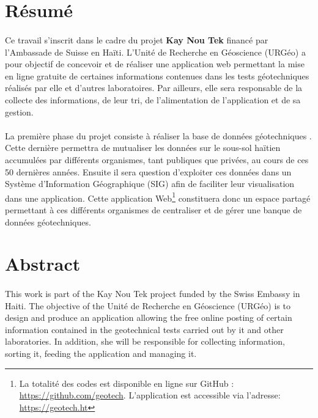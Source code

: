 \section{Résumé}
\paragraph{}
Ce travail s'inscrit dans le cadre du projet \textbf{Kay Nou Tek}
financé par l’Ambassade de Suisse en Haïti. 
L'Unité de Recherche en Géoscience (URGéo) a pour objectif de concevoir et de réaliser
une application web permettant la mise en 
ligne gratuite de certaines informations contenues dans les tests 
géotechniques réalisés par elle et d’autres laboratoires.
Par ailleurs, elle sera responsable de la collecte des informations, de leur tri, de l’alimentation 
de l’application et de sa gestion. 
\paragraph{}
La première phase du projet consiste à réaliser la base de données géotechniques
. Cette dernière permettra de mutualiser les données 
 sur le sous-sol haïtien accumulées par différents organismes, tant publiques que privées, 
 au cours de ces 50 dernières années. Ensuite il sera question d'exploiter ces 
 données dans un Système d'Information Géographique (SIG)  afin de faciliter leur visualisation dans une application.
  Cette application 
 Web\footnote{ 
    La totalité des codes est disponible en ligne sur GitHub : 
    \url{https://github.com/geotech}.
    L’application est accessible via l’adresse: 
    \url{https://geotech.ht}
    }
 constituera donc un espace 
 partagé permettant à ces différents organismes de centraliser et de gérer une banque 
 de données géotechniques.


\newpage
\section{Abstract}
\paragraph{}
This work is part of the Kay Nou Tek project funded by the Swiss 
Embassy in Haiti. The objective of the Unité de Recherche en Géoscience (URGéo) 
is to design and produce an application allowing the free online posting 
of certain information contained in the geotechnical tests carried out by 
it and other laboratories. In addition, she will be responsible for collecting 
information, sorting it, feeding the application and managing it.
